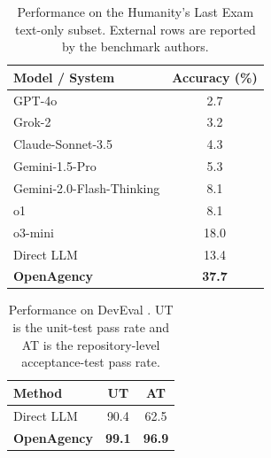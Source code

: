 \documentclass{article} %
\begin{document}
\begin{table}[t]
\caption{Performance on the Humanity's Last Exam text-only subset. External rows are reported by the benchmark authors.}
\label{tab:hle}
\begin{center}
\small
\setlength{\tabcolsep}{6pt}
\begin{tabular}{lc}
\toprule
\textbf{Model / System} & \textbf{Accuracy (\%)} \\
\midrule
GPT-4o                          & 2.7 \\
Grok-2                          & 3.2 \\
Claude-Sonnet-3.5               & 4.3 \\
Gemini-1.5-Pro                  & 5.3 \\
Gemini-2.0-Flash-Thinking       & 8.1 \\
o1                              & 8.1 \\
o3-mini                          & 18.0 \\
\midrule
Direct LLM                                         & 13.4 \\
\rowcolor{gray!12}
\textbf{OpenAgency}                            & \textbf{37.7} \\
\bottomrule
\end{tabular}
\end{center}
\end{table}

\begin{table}[t]
\caption{Performance on DevEval \citep{li2024deveval}. UT is the unit-test pass rate and AT is the repository-level acceptance-test pass rate.}
\label{tab:deveval}
\begin{center}
\small
\setlength{\tabcolsep}{4pt}
\begin{tabular}{lcc}
\toprule
\textbf{Method} & \textbf{UT} & \textbf{AT} \\
\midrule
Direct LLM  & 90.4 & 62.5 \\
\rowcolor{gray!12}
\textbf{OpenAgency} & \textbf{99.1} & \textbf{96.9} \\
\bottomrule
\end{tabular}
\end{center}
\end{table}
\end{document}
